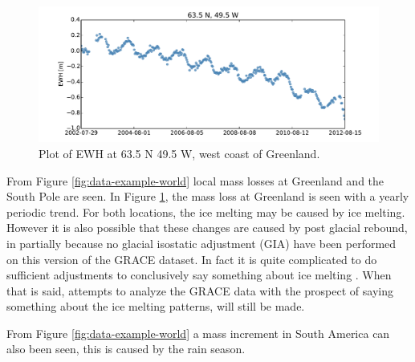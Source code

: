 \begin{figure}[H]
	\centering
	\includegraphics[width=\textwidth]{figures/data-example-scatter}
	\caption{Plot of EWH at 63.5 N 49.5 W, west coast of Greenland.}
	\label{fig:data-example-scatter}
\end{figure}

From Figure \ref{fig:data-example-world} local mass losses at Greenland and the South Pole are seen.
In Figure \ref{fig:data-example-scatter}, the mass loss at Greenland is seen with a yearly periodic trend. For both locations, the ice melting may be caused by ice melting. 
However it is also possible that these changes are caused by post glacial rebound, in partially because no glacial isostatic adjustment (GIA) have been performed on this version of the GRACE dataset. 
In fact it is quite complicated to do sufficient adjustments to conclusively say something about ice melting \cite{NASA-GIA}.
When that is said, attempts to analyze the GRACE data with the prospect of saying something about the ice melting patterns, will still be made.

From Figure \ref{fig:data-example-world} a mass increment in South America can also been seen, this is caused by the rain season.
